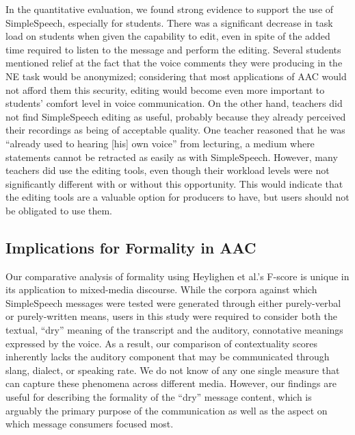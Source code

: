 In the quantitative evaluation, we found strong evidence to support the use of SimpleSpeech, especially for students.
There was a significant decrease in task load on students when given the capability to edit, even in spite of the added time required to listen to the message and perform the editing. 
Several students mentioned relief at the fact that the voice comments they were producing in the NE task would be anonymized; considering that most applications of AAC would not afford them this security, editing would become even more important to students' comfort level in voice communication.
On the other hand, teachers did not find SimpleSpeech editing as useful, probably because they already perceived their recordings as being of acceptable quality. 
One teacher reasoned that he was ``already used to hearing [his] own voice'' from lecturing, a medium where statements cannot be retracted as easily as with SimpleSpeech.
However, many teachers did use the editing tools, even though their workload levels were not significantly different with or without this opportunity.
This would indicate that the editing tools are a valuable option for producers to have, but users should not be obligated to use them.

\subsection{Implications for Formality in AAC}
Our comparative analysis of formality using Heylighen et al.'s F-score \cite{heylighen} is unique in its application to mixed-media discourse.
While the corpora against which SimpleSpeech messages were tested were generated through either purely-verbal or purely-written means, users in this study were required to consider both the textual, ``dry'' meaning of the transcript and the auditory, connotative meanings expressed by the voice.
As a result, our comparison of contextuality scores inherently lacks the auditory component that may be communicated through slang, dialect, or speaking rate.
We do not know of any one single measure that can capture these phenomena across different media.
However, our findings are useful for describing the formality of the ``dry'' message content, which is arguably the primary purpose of the communication as well as the aspect on which message consumers focused most.

